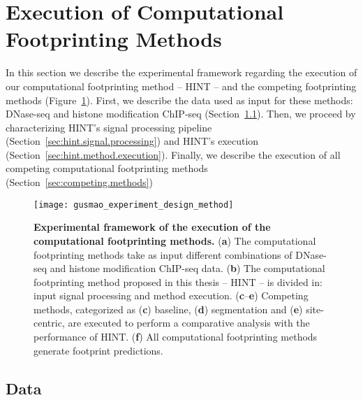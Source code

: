 \section{Execution of Computational Footprinting Methods}
\label{sec:execution.computational.footprinting.methods}

In this section we describe the experimental framework regarding the execution of our computational footprinting method -- HINT -- and the competing footprinting methods (Figure~\ref{fig:gusmao_experiment_design_method}). First, we describe the data used as input for these methods: DNase-seq and histone modification ChIP-seq (Section~\ref{sec:execution.data}). Then, we proceed by characterizing HINT's signal processing pipeline (Section~\ref{sec:hint.signal.processing}) and HINT's execution (Section~\ref{sec:hint.method.execution}). Finally, we describe the execution of all competing computational footprinting methods (Section~\ref{sec:competing.methods})

\begin{figure}[h!]
\centering
\texttt{[image: gusmao\_experiment\_design\_method]}
\caption[Experimental framework of the execution of the computational footprinting methods]{\textbf{Experimental framework of the execution of the computational footprinting methods.} (\textbf{a}) The computational footprinting methods take as input different combinations of DNase-seq and histone modification ChIP-seq data. (\textbf{b}) The computational footprinting method proposed in this thesis -- HINT -- is divided in: input signal processing and method execution. (\textbf{c}--\textbf{e}) Competing methods, categorized as (\textbf{c}) baseline, (\textbf{d}) segmentation and (\textbf{e}) site-centric, are executed to perform a comparative analysis with the performance of HINT. (\textbf{f}) All computational footprinting methods generate footprint predictions.}
\label{fig:gusmao_experiment_design_method}
\end{figure}

\subsection{Data}
\label{sec:execution.data}

